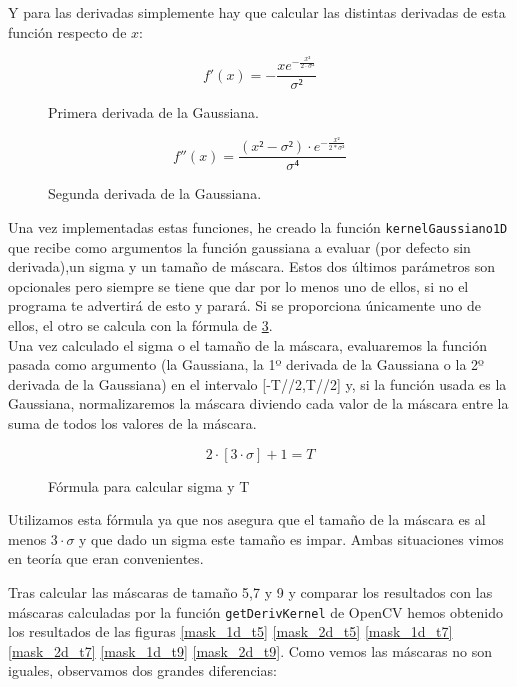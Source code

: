 \documentclass[12pt,spanish]{article}
\begin{document}
Y para las derivadas simplemente hay que calcular las distintas derivadas de esta función respecto de $x$: 

\begin{figure}[H]
	\centering
	\[f'(x) = -\frac{x e^{-\frac{x²}{2 \cdot \sigma²}}}{\sigma²} \]
	\caption{Primera derivada de la Gaussiana.}
	\label{1d_gaussiana}
\end{figure}

\begin{figure}[H]
	\centering
	\[f''(x) = \frac{(x² - \sigma²) \cdot e^{-\frac{x²}{2*\sigma²}}}{\sigma⁴} \]
	\caption{Segunda derivada de la Gaussiana.}
	\label{2d_gaussiana}
\end{figure}

Una vez implementadas estas funciones, he creado la función \texttt{kernelGaussiano1D} que recibe como argumentos la función gaussiana a evaluar (por defecto sin derivada),un sigma y un tamaño de máscara. Estos dos últimos parámetros son opcionales pero siempre se tiene que dar por lo menos uno de ellos, si no el programa te advertirá de esto y parará. Si se proporciona únicamente uno de ellos, el otro se calcula con la fórmula de \ref{f_sigma_tam}. \\

Una vez calculado el sigma o el tamaño de la máscara, evaluaremos la función pasada como argumento (la Gaussiana, la 1º derivada de la Gaussiana o la 2º derivada de la Gaussiana) en el intervalo [-T//2,T//2] y, si la función usada es la Gaussiana, normalizaremos la máscara diviendo cada valor de la máscara entre la suma de todos los valores de la máscara.

\begin{figure}[H]
	\centering
	\[ 2 \cdot [3 \cdot \sigma] + 1 = T \]
	\caption{Fórmula para calcular sigma y T}
	\label{f_sigma_tam}
\end{figure}

Utilizamos esta fórmula ya que nos asegura que el tamaño de la máscara es al menos $3 \cdot \sigma$ y que dado un sigma este tamaño es impar. Ambas situaciones vimos en teoría que eran convenientes.

Tras calcular las máscaras de tamaño 5,7 y 9 y comparar los resultados con las máscaras calculadas por la función \texttt{getDerivKernel} de OpenCV hemos obtenido los resultados de las figuras \ref{mask_1d_t5} \ref{mask_2d_t5} \ref{mask_1d_t7} \ref{mask_2d_t7} \ref{mask_1d_t9} \ref{mask_2d_t9}. Como vemos las máscaras no son iguales, observamos dos grandes diferencias:
\end{document}
